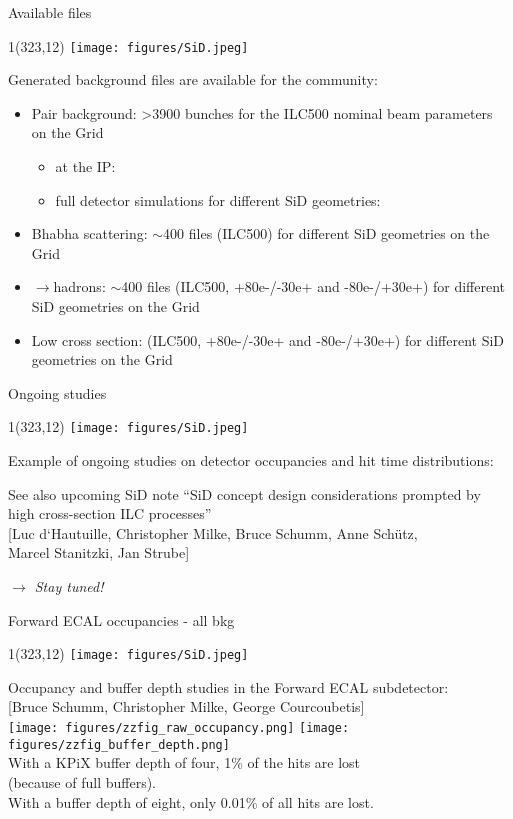 \documentclass[xcolor={dvipsnames}]{beamer}
\newcommand{\sidlogo}{
  \setlength{\TPHorizModule}{1pt}
  \setlength{\TPVertModule}{1pt}
  \begin{textblock}{1}(323,12)
   \texttt{[image: figures/SiD.jpeg]}
  \end{textblock}
  }
\begin{document}
\begin{frame}{Available files}
\sidlogo
 Generated background files are available for the community:
 \begin{itemize}
  \item Pair background: >3900 bunches for the ILC500 nominal beam parameters on the Grid
  \begin{itemize}
   \item at the IP: \cite{Grid}
   \item full detector simulations for different SiD geometries: \cite{Jan_Grid}
  \end{itemize}
  \item Bhabha scattering: $\sim$400 files (ILC500) for different SiD geometries on the Grid \cite{Jan_Grid}
  \item \textgamma\textgamma$\rightarrow$hadrons: $\sim$400 files (ILC500, +80e-/-30e+ and -80e-/+30e+) for different SiD geometries on the Grid \cite{Jan_Grid}
  \item Low cross section: (ILC500, +80e-/-30e+ and -80e-/+30e+) for different SiD geometries on the Grid \cite{Jan_Grid}
 \end{itemize}

\end{frame}


\begin{frame}{Ongoing studies}
\sidlogo
Example of ongoing studies on detector occupancies and hit time distributions:\\
\begin{block}{See also upcoming SiD note}
 \large``SiD concept design considerations prompted by high cross-section ILC processes''\\
 \small[Luc d`Hautuille, Christopher Milke, Bruce Schumm, Anne Sch\"utz, \\Marcel Stanitzki, Jan Strube]
\end{block}
\textit{\normalsize $\rightarrow$ Stay tuned!}
\end{frame}

\begin{frame}{Forward ECAL occupancies - all bkg}
\sidlogo
Occupancy and buffer depth studies in the Forward ECAL subdetector:\\
\flushright \tiny [Bruce Schumm, Christopher Milke, George Courcoubetis]\\
 \texttt{[image: figures/zzfig\_raw\_occupancy.png]}
\texttt{[image: figures/zzfig\_buffer\_depth.png]}\\
\flushleft \normalsize With a KPiX buffer depth of four, 1\% of the hits are lost\\ (because of full buffers).\\
With a buffer depth of eight, only 0.01\% of all hits are lost.
\end{frame}
\end{document}
